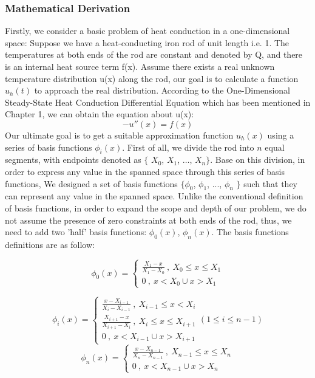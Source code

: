 \documentclass{article}
\begin{document}
    \subsubsection{Mathematical Derivation}
   Firstly, we consider a basic problem of heat conduction in a one-dimensional space: Suppose we have a heat-conducting iron rod of unit length i.e. 1. The temperatures at both ends of the rod are constant and denoted by Q, and there is an internal heat source term f(x). Assume there exists a real unknown temperature distribution u(x) along the rod, our goal is to calculate a function $u_{h}(t)$ to approach the real distribution. According to the One-Dimensional Steady-State Heat Conduction Differential Equation which has been mentioned in Chapter 1, we can obtain the equation about u(x):
    \begin{equation}
        -u''(x)=f(x)\label{basic formula}
    \end{equation}
    Our ultimate goal is to get a suitable approximation function $u_h(x)$ using a series of basis functions $\phi_i(x)$. First of all, we divide the rod into $n$ equal segments, with endpoints denoted as $\{$ $X_0$, $X_1$, $\ldots$, $X_n$$\}$.  Base on this division, in order to express any value in the spanned space through this series of basis functions, We designed a set of basis functions $\{$$\phi_0$, $\phi_1$, ..., $\phi_n $ $\}$ such that they can represent any value in the spanned space. Unlike the conventional definition of basis functions, in order to expand the scope and depth of our problem, we do not assume the presence of zero constraints at both ends of the rod, thus, we need to add two 'half' basis functions: $\phi_0(x)$, $\phi_n(x)$. The basis functions definitions are as follow:

    \begin{equation}
    \phi_{0}(x) =
    \begin{cases}
        \frac{X_{1}-x}{X_{1}-X_{0}}\: ,\: X_{0}\leq x\le X_{1}\\
        0 \: ,\: x < X_{0} \cup x>X_{1}
    \end{cases}
    \end{equation}
    
    \begin{equation}
        \phi_{i}(x) =
    \begin{cases}
        \frac{x-X_{i-1}}{X_{i}-X_{i-1}} \: ,\: X_{i-1}\leq x<X_{i}\\
        \frac{X_{i+1}-x}{X_{i+1}-X_{i}} \: ,\: X_{i}\leq x\le X_{i+1}\\
        0 \: ,\: x < X_{i-1} \cup x>X_{i+1}
    \end{cases}
    (1\le i\le n-1)
    \end{equation}
        \begin{equation}
        \phi_{n}(x) =
        \begin{cases}
            \frac{x-X_{n-1}}{X_{n}-X_{n-1}}\: ,\: X_{n-1}\leq x\le X_{n}\\
        0 \: ,\: x < X_{n-1} \cup x>X_{n}
        \label{basis function}
        \end{cases}
    \end{equation}
    
\end{document}
